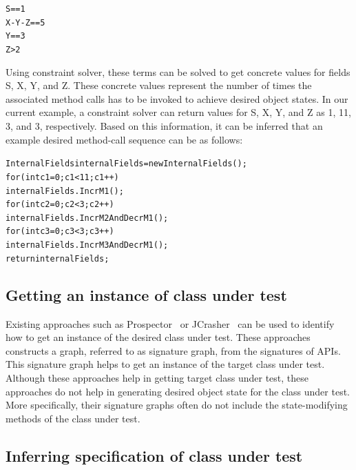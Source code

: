 \begin{center}
\begin{CodeOut}
\begin{alltt}
S == 1
X - Y - Z == 5
Y == 3
Z > 2
\end{alltt}
\end{CodeOut}
\end{center}

Using constraint solver, these terms can be solved to get concrete values for fields S, X, Y, and Z. These concrete values represent the number of times the associated method calls has to be invoked to achieve desired object states. In our current example, a constraint solver can return values for S, X, Y, and Z as 1, 11, 3, and 3, respectively. Based on this information, it can be inferred that an example desired method-call sequence can be as follows:

\begin{CodeOut}
\begin{alltt}
InternalFields internalFields = new InternalFields();
for(int c1 = 0; c1 < 11; c1++)
\hspace*{0.3in}internalFields.IncrM1();
for (int c2 = 0; c2 < 3; c2++)
\hspace*{0.3in}internalFields.IncrM2AndDecrM1();
for (int c3 = 0; c3 < 3; c3++)
\hspace*{0.3in}internalFields.IncrM3AndDecrM1();            
return internalFields;
\end{alltt}
\end{CodeOut}

\subsection{Getting an instance of class under test}

Existing approaches such as Prospector~\cite{prospector:jungloid} or JCrasher~\cite{csallner:jcrasher} can be used to identify how to get an instance of the desired class under test. These approaches constructs a graph, referred to as signature graph, from the signatures of APIs. This signature graph helps to get an instance of the target class under test. Although these approaches help in getting target class under test, these approaches do not help in generating desired object state for the class under test. More specifically, their signature graphs often do not include the state-modifying methods of the class under test.

\subsection{Inferring specification of class under test}

